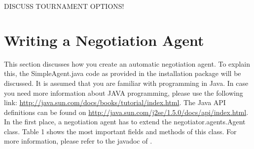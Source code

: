 \documentclass[]{article}
\begin{document}
DISCUSS TOURNAMENT OPTIONS!

\section{Writing a Negotiation Agent}


This section discusses how you create an automatic negotiation agent. To explain this, the SimpleAgent.java code as provided in the installation package will be discussed.
It is assumed that you are familiar with programming in Java. In case you need more information about JAVA programming, please use the following link: \url{http://java.sun.com/docs/books/tutorial/index.html}. The Java API definitions can be found on \url{http://java.sun.com/j2se/1.5.0/docs/api/index.html}.
In the first place, a negotiation agent has to extend the negotiator.agents.Agent class. Table 1 shows the most important fields and methods of this class. For more information, please refer to the javadoc of \Genius.
\end{document}
